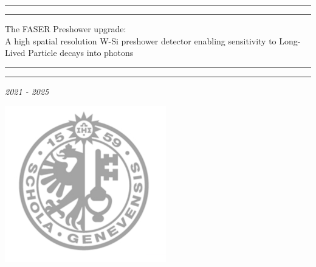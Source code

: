 \documentclass[a4paper, 11pt, twoside]{report}
\begin{document}
\begin{titlepage}
	\centering %
	\scshape %
	\vspace*{\baselineskip} %
	
	
	\rule{\textwidth}{1.6pt}\vspace*{-\baselineskip}\vspace*{2pt} %
	\rule{\textwidth}{0.4pt} %
	
	\vspace{0.75\baselineskip} %
	
	{\LARGE The FASER Preshower upgrade:\\} 
	\vspace{0.25\baselineskip}
	{\Large A high spatial resolution W-Si preshower detector enabling sensitivity to Long-Lived Particle decays into photons\\}
	
	\vspace{0.75\baselineskip} %
	
	\rule{\textwidth}{0.4pt}\vspace*{-\baselineskip}\vspace{3.2pt} %
	\rule{\textwidth}{1.6pt} %
	
	\vspace{2\baselineskip} %
	
	
	\textit{2021 - 2025}
	
	\vspace*{0.5\baselineskip} %
	
	
	\begin{center}  \includegraphics[width=7cm]{UniGe_Logo}  \end{center}
	

\end{titlepage}
\end{document}
